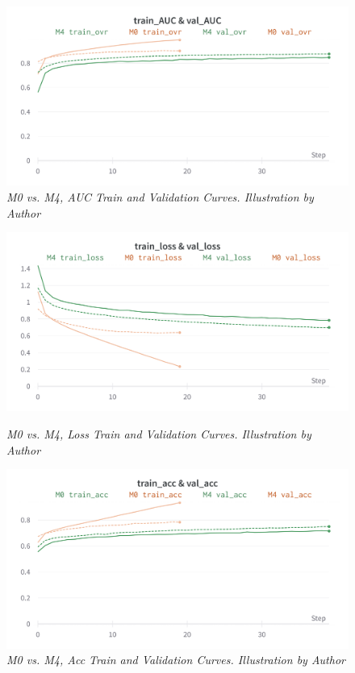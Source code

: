 \begin{figure}[H]
\centering
    \includegraphics[width=\textwidth]{imatges/results/AUCM0M4.png}
\caption[M0 vs. M4, AUC Train and Validation Curves]{\textit{M0 vs. M4, AUC Train and Validation Curves. Illustration by Author}}
\end{figure}

\newpage

\begin{figure}[H]
\centering
    \includegraphics[width=\textwidth]{imatges/results/LossM0M4.png}
\caption[M0 vs. M4, Loss Train and Validation Curves]{\textit{M0 vs. M4, Loss Train and Validation Curves. Illustration by Author}}
{\label{fig:lossm0m4}}
\end{figure}

\begin{figure}[H]
\centering
    \includegraphics[width=\textwidth]{imatges/results/AccM0M4.png}
\caption[M0 vs. M4, Acc Train and Validation Curves]{\textit{M0 vs. M4, Acc Train and Validation Curves. Illustration by Author}}
\end{figure}

